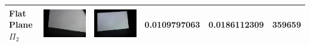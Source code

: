 \documentclass[final,12pt,3p]{elsarticle}
\begin{document}
\begin{table}[!ht]
{\begin{tabular}{| l | >{\centering\arraybackslash} m{2.5cm} | >{\centering\arraybackslash} m{2.5cm} | c | c | c |}
   Flat Plane $\Pi_{2}$ & \includegraphics[scale=0.05]{./plane2_cam1.JPG} & \includegraphics[scale=0.05]{./plane2_cam2.JPG} & 0.0109797063 & 0.0186112309 & 359659\\
   \hline

\end{tabular}}
\end{table}
\end{document}
